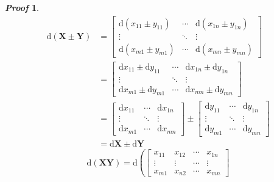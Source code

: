 \documentclass{article}
\newcommand{\Differential}{\ensuremath{\mathrm{d}}}
\newcommand{\MatrixSymbol}[1]{\ensuremath{{\boldsymbol{#1}}}}
\newcommand{\MatrixX}{\MatrixSymbol{X}}
\newcommand{\MatrixY}{\MatrixSymbol{Y}}
\theoremstyle{nonumberplain}
\newtheorem{Proof}{\textit{\textbf{Proof}}}
\begin{document}
\begin{Proof}
    \begin{equation*}
        \begin{split}
            \Differential(\MatrixX\pm\MatrixY)&=\begin{bmatrix}
                \Differential(x_{11}\pm y_{11})&\cdots&\Differential(x_{1n}\pm y_{1n})\\
                \vdots&\ddots&\vdots\\
                \Differential(x_{m1}\pm y_{m1})&\cdots&\Differential(x_{mn}\pm y_{mn})
            \end{bmatrix}\\
            &=\begin{bmatrix}
                \Differential x_{11}\pm \Differential y_{11}&\cdots&\Differential x_{1n}\pm \Differential y_{1n}\\
                \vdots&\ddots&\vdots\\
                \Differential x_{m1}\pm \Differential y_{m1}&\cdots&\Differential x_{mn}\pm \Differential y_{mn}
            \end{bmatrix}\\
            &=\begin{bmatrix}
                \Differential x_{11}&\cdots&\Differential x_{1n}\\
                \vdots&\ddots&\vdots\\
                \Differential x_{m1}&\cdots&\Differential x_{mn}
            \end{bmatrix}\pm \begin{bmatrix}
                \Differential y_{11}&\cdots&\Differential y_{1n}\\
                \vdots&\ddots&\vdots\\
                \Differential y_{m1}&\cdots&\Differential y_{mn}
            \end{bmatrix}\\
            &=\Differential \MatrixX \pm \Differential \MatrixY
        \end{split}
    \end{equation*}
    \begin{equation*}
        \Differential(\MatrixX\MatrixY)
            =\Differential\left( \begin{bmatrix}
                x_{11}&x_{12}&\cdots&x_{1n}\\
                \vdots&\vdots&\cdots&\vdots\\
                x_{m1}&x_{n2}&\cdots&x_{mn}

\end{bmatrix}
\end{equation*}
\end{Proof}
\end{document}
